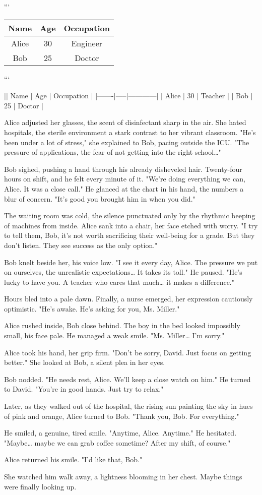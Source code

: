 \documentclass{article}
\begin{document}
```
\begin{tabular}{ccc}
    \hline
    Name & Age & Occupation \\
    \hline
    Alice & 30 & Engineer \\
    Bob & 25 & Doctor \\
    \hline
\end{tabular}
```

|| Name  | Age | Occupation |
|-------|-----|------------|
| Alice | 30  | Teacher    |
| Bob   | 25  | Doctor     |

Alice adjusted her glasses, the scent of disinfectant sharp in the air. She hated hospitals, the sterile environment a stark contrast to her vibrant classroom. "He's been under a lot of stress," she explained to Bob, pacing outside the ICU. "The pressure of applications, the fear of not getting into the right school…"

Bob sighed, pushing a hand through his already disheveled hair. Twenty-four hours on shift, and he felt every minute of it. "We're doing everything we can, Alice. It was a close call." He glanced at the chart in his hand, the numbers a blur of concern. "It's good you brought him in when you did."

The waiting room was cold, the silence punctuated only by the rhythmic beeping of machines from inside. Alice sank into a chair, her face etched with worry. "I try to tell them, Bob, it's not worth sacrificing their well-being for a grade. But they don't listen. They see success as the only option."

Bob knelt beside her, his voice low. "I see it every day, Alice. The pressure we put on ourselves, the unrealistic expectations… It takes its toll." He paused. "He's lucky to have you. A teacher who cares that much… it makes a difference."

Hours bled into a pale dawn. Finally, a nurse emerged, her expression cautiously optimistic. "He's awake. He's asking for you, Ms. Miller."

Alice rushed inside, Bob close behind. The boy in the bed looked impossibly small, his face pale. He managed a weak smile. "Ms. Miller… I’m sorry."

Alice took his hand, her grip firm. "Don't be sorry, David. Just focus on getting better." She looked at Bob, a silent plea in her eyes.

Bob nodded. "He needs rest, Alice. We’ll keep a close watch on him." He turned to David. "You're in good hands. Just try to relax."

Later, as they walked out of the hospital, the rising sun painting the sky in hues of pink and orange, Alice turned to Bob. "Thank you, Bob. For everything."

He smiled, a genuine, tired smile. "Anytime, Alice. Anytime." He hesitated. "Maybe… maybe we can grab coffee sometime? After my shift, of course."

Alice returned his smile. "I'd like that, Bob."

She watched him walk away, a lightness blooming in her chest. Maybe things were finally looking up.
\end{document}
